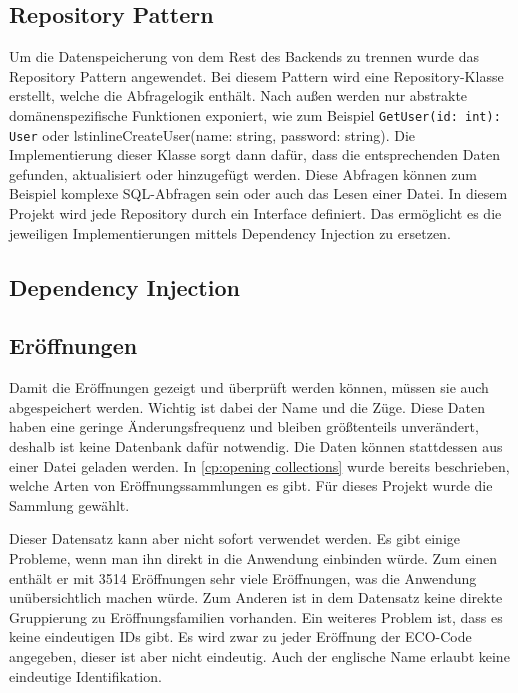 \subsection{Repository Pattern}
Um die Datenspeicherung von dem Rest des Backends zu trennen wurde das Repository Pattern angewendet. Bei diesem Pattern wird eine Repository-Klasse erstellt, welche die Abfragelogik enthält. Nach außen werden nur abstrakte domänenspezifische Funktionen exponiert, wie zum Beispiel \lstinline{GetUser(id: int): User} oder lstinline{CreateUser(name: string, password: string)}. Die Implementierung dieser Klasse sorgt dann dafür, dass die entsprechenden Daten gefunden, aktualisiert oder hinzugefügt werden. Diese Abfragen können zum Beispiel komplexe SQL-Abfragen sein oder auch das Lesen einer Datei. In diesem Projekt wird jede Repository durch ein Interface definiert. Das ermöglicht es die jeweiligen Implementierungen mittels Dependency Injection zu ersetzen. \cite{evans_domain-driven_2004}

\subsection{Dependency Injection}

\subsection{Eröffnungen}
Damit die Eröffnungen gezeigt und überprüft werden können, müssen sie auch abgespeichert werden. Wichtig ist dabei der Name und die Züge. Diese Daten haben eine geringe Änderungsfrequenz und bleiben größtenteils unverändert, deshalb ist keine Datenbank dafür notwendig. Die Daten können stattdessen aus einer Datei geladen werden. In \autoref{cp:opening collections} wurde bereits beschrieben, welche Arten von Eröffnungssammlungen es gibt. Für dieses Projekt wurde die Sammlung \cite{lichessorg_chess-openings_2025} gewählt.

Dieser Datensatz kann aber nicht sofort verwendet werden. Es gibt einige Probleme, wenn man ihn direkt in die Anwendung einbinden würde. Zum einen enthält er mit 3514 Eröffnungen sehr viele Eröffnungen, was die Anwendung unübersichtlich machen würde. Zum Anderen ist in dem Datensatz keine direkte Gruppierung zu Eröffnungsfamilien vorhanden. Ein weiteres Problem ist, dass es keine eindeutigen IDs gibt. Es wird zwar zu jeder Eröffnung der ECO-Code angegeben, dieser ist aber nicht eindeutig. Auch der englische Name erlaubt keine eindeutige Identifikation.

